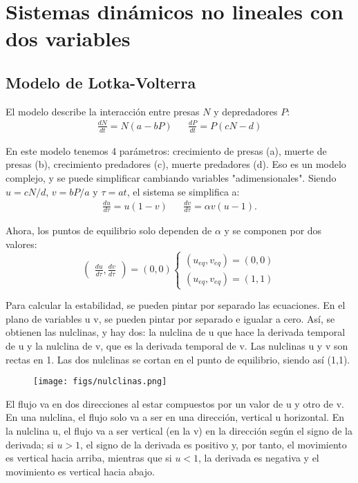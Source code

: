 \section{Sistemas dinámicos no lineales con dos variables}
\subsection{Modelo de Lotka-Volterra}
El modelo describe la interacción entre presas $N$ y depredadores $P$:
\begin{align*}
\frac{dN}{dt} = N(a - bP) &&
\frac{dP}{dt} = P(cN - d)
\end{align*}

En este modelo tenemos 4 parámetros: crecimiento de presas (a), muerte de presas (b), crecimiento predadores (c), muerte predadores (d). Eso es un modelo complejo, y se puede simplificar cambiando variables "adimensionales". Siendo $u = cN/d$, $v = bP/a$ y $\tau = at$, el sistema se simplifica a:
\begin{align*}
\frac{du}{d\tau} = u(1 - v) &&
\frac{dv}{d\tau} = \alpha v(u - 1).
\end{align*}

Ahora, los puntos de equilibrio solo dependen de $\alpha$ y se componen por dos valores:
$$\begin{pmatrix}
\frac{du}{d\tau}, \frac{dv}{d\tau}
\end{pmatrix} = (0,0) \begin{cases}
(u_{eq}, v_{eq}) = (0,0) \\
(u_{eq}, v_{eq}) = (1,1) 
\end{cases}$$

Para calcular la estabilidad, se pueden pintar por separado las ecuaciones. En el plano de variables u v, se pueden pintar por separado e igualar a cero. Así, se obtienen las nulclinas, y hay dos: la nulclina de u que hace la derivada temporal de u y la nulclina de v, que es la derivada temporal de v. Las nulclinas u y v son rectas en 1. Las dos nulclinas se cortan en el punto de equilibrio, siendo así (1,1).

\begin{figure}[h]
\centering
\texttt{[image: figs/nulclinas.png]}
\end{figure}

El flujo va en dos direcciones al estar compuestos por un valor de u y otro de v. En una nulclina, el flujo solo va a ser en una dirección, vertical u horizontal. En la nulclina u, el flujo va a ser vertical (en la v) en la dirección según el signo de la derivada; si $u > 1$, el signo de la derivada es positivo y, por tanto, el movimiento es vertical hacia arriba, mientras que si $u < 1$, la derivada es negativa y el movimiento es vertical hacia abajo. 

